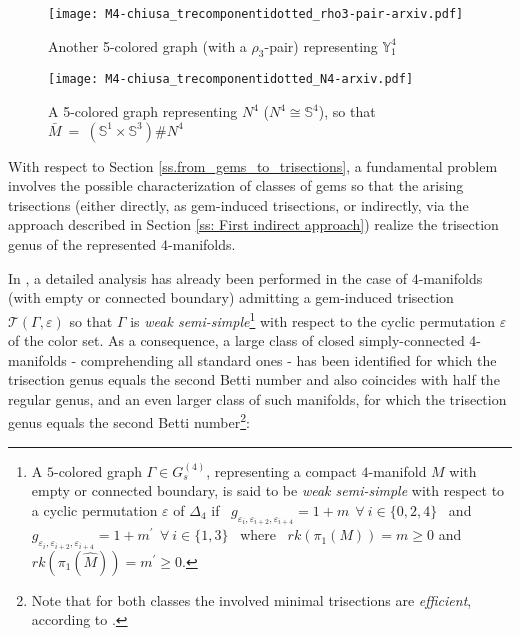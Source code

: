 \documentclass[12pt,a4paper]{article}
\newcommand{\e}{\varepsilon}
\newcommand{\G}{\Gamma}
\begin{document}
\begin{figure} [ht]  %
    \centering
    \texttt{[image: M4-chiusa\_trecomponentidotted\_rho3-pair-arxiv.pdf]}
    \caption{Another 5-colored graph (with a $\rho_3$-pair) representing     $\mathbb Y^4_1 $ } 
\label{fig:M4_3comp_dotted_ro-coppia}
\end{figure}

\begin{figure} [ht]  %
    \centering
    \texttt{[image: M4-chiusa\_trecomponentidotted\_N4-arxiv.pdf]}
    \caption{A 5-colored graph representing $N^4$ ($N^4\cong \mathbb S^4$),  so that $\bar M \ = \ (\mathbb S^1 \times \mathbb S^3) \# N^4$} 
\label{fig:M4-chiusa_3comp_dotted}
\end{figure}

With respect to Section \ref{ss.from_gems_to_trisections}, a fundamental problem involves the possible characterization of classes of gems so that the arising trisections (either directly, as gem-induced trisections, or indirectly, via the approach described in Section \ref{ss: First indirect approach}) realize  
the trisection genus of the represented $4$-manifolds. 

In \cite[Section 6]{Casali-Cristofori gem-induced}, a detailed analysis has already been performed in the case of $4$-manifolds (with empty or connected boundary) admitting a gem-induced trisection $\mathcal T(\Gamma, \e)$ so that $\Gamma$ is {\it weak semi-simple}\footnote{A $5$-colored graph $\G\in G_s^{(4)}$,  representing a compact $4$-manifold $M$ with empty or connected boundary, is said to be {\em weak  semi-simple} with respect to a cyclic permutation $\varepsilon$ of $\Delta_4$ if \, $g_{\varepsilon_i,\varepsilon_{i+2},\varepsilon_{i+4}} = 1 + m \ \ \forall \ i \in \{0,2,4\}$ \, and \, $g_{\varepsilon_i,\varepsilon_{i+2},\varepsilon_{i+4}} = 1 + m^{\prime} \ \ \forall \ i \in \{1,3\}$ \,  where  \, $rk(\pi_1(M))= m \ge 0$ and  $rk(\pi_1(\widehat M))= m^{\prime} \ge 0$.} with respect to the cyclic permutation $\e$ of the color set. 
As a consequence, a large class of closed simply-connected 4-manifolds - comprehending all standard ones - has been identified for which the trisection genus equals the second Betti number and also coincides with half the regular genus, and an even larger class of such manifolds, for which the trisection genus equals the second Betti number\footnote{Note that for both classes the involved minimal trisections are {\it efficient}, according to \cite{Lambert-Cole-Meier}.}:   
\end{document}
